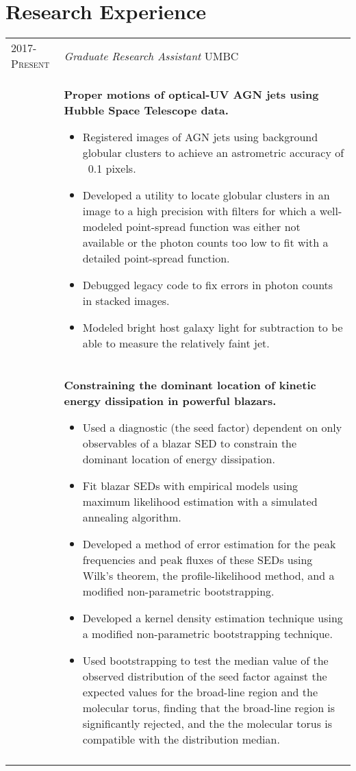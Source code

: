 %
%
%

\section{\texorpdfstring{\color{Blue}Research Experience}{Research Experience}}
\begin{longtable}{R{2.5cm}|p{14.8cm}}
 	\textsc{2017-Present}& \emph{Graduate Research Assistant} UMBC\\&
 	\footnotesize{
 		\textbf{Proper motions of optical-UV AGN jets using Hubble Space Telescope data.}
 		\begin{itemize}
			\item Registered images of AGN jets using background globular clusters to achieve an astrometric accuracy of ~0.1 pixels.
            \item Developed a utility to locate globular clusters in an image to a high precision with filters for which a well-modeled point-spread function was either not available or the photon counts too low to fit with a detailed point-spread function.
            \item Debugged legacy code to fix errors in photon counts in stacked images.
            \item Modeled bright host galaxy light for subtraction to be able to measure the relatively faint jet.
		\end{itemize}
		\vspace{-1em}
        }\\&
        \footnotesize{
     		\textbf{Constraining the dominant location of kinetic energy dissipation in powerful blazars.}
     		\begin{itemize}
    			\item Used a diagnostic (the seed factor) dependent on only observables of a blazar SED to constrain the dominant location of energy dissipation.
    			\item Fit blazar SEDs with empirical models using maximum likelihood estimation with a simulated annealing algorithm.
    			\item Developed a method of error estimation for the peak frequencies and peak fluxes of these SEDs using Wilk's theorem, the profile-likelihood method, and a modified non-parametric bootstrapping.
    			\item Developed a kernel density estimation technique using a modified non-parametric bootstrapping technique.
                \item Used bootstrapping to test the median value of the observed distribution of the seed factor against the expected values for the broad-line region and the molecular torus, finding that the broad-line region is significantly rejected, and the the molecular torus is compatible with the distribution median.
    		\end{itemize}
    		\vspace{-1em}

	}\\
  \\
\end{longtable}
